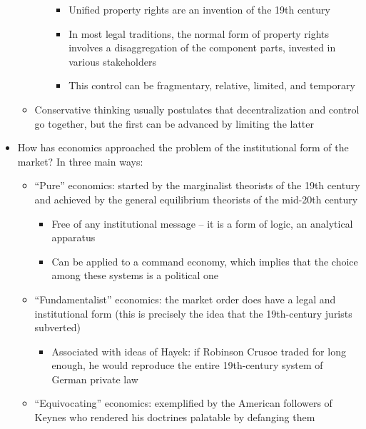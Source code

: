 \begin{itemize}
\begin{itemize}
\begin{itemize}
      \begin{itemize}
      \tightlist
      \item
        Unified property rights are an invention of the 19th century
      \item
        In most legal traditions, the normal form of property rights
        involves a disaggregation of the component parts, invested in
        various stakeholders
      \item
        This control can be fragmentary, relative, limited, and
        temporary
      \end{itemize}
    \end{itemize}
  \item
    Conservative thinking usually postulates that decentralization and
    control go together, but the first can be advanced by limiting the
    latter
  \end{itemize}
\item
  How has economics approached the problem of the institutional form of
  the market? In three main ways:

  \begin{itemize}
  \tightlist
  \item
    ``Pure'' economics: started by the marginalist theorists of the 19th
    century and achieved by the general equilibrium theorists of the
    mid-20th century

    \begin{itemize}
    \tightlist
    \item
      Free of any institutional message -- it is a form of logic, an
      analytical apparatus
    \item
      Can be applied to a command economy, which implies that the choice
      among these systems is a political one
    \end{itemize}
  \item
    ``Fundamentalist'' economics: the market order does have a legal and
    institutional form (this is precisely the idea that the 19th-century
    jurists subverted)

    \begin{itemize}
    \tightlist
    \item
      Associated with ideas of Hayek: if Robinson Crusoe traded for long
      enough, he would reproduce the entire 19th-century system of
      German private law
    \end{itemize}
  \item
    ``Equivocating'' economics: exemplified by the American followers of
    Keynes who rendered his doctrines palatable by defanging them


\end{itemize}
\end{itemize}
